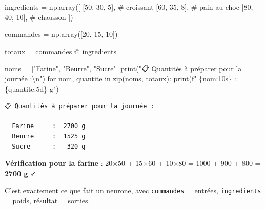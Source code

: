 \documentclass[
  french,
  11pt,
  a4paper,
]{scrbook}
\newenvironment{Shaded}{}{}
\newcommand{\BuiltInTok}[1]{\textcolor[rgb]{0.84,0.23,0.29}{#1}}
\newcommand{\CharTok}[1]{\textcolor[rgb]{0.01,0.18,0.38}{#1}}
\newcommand{\CommentTok}[1]{\textcolor[rgb]{0.42,0.45,0.49}{#1}}
\newcommand{\ControlFlowTok}[1]{\textcolor[rgb]{0.84,0.23,0.29}{#1}}
\newcommand{\DecValTok}[1]{\textcolor[rgb]{0.00,0.36,0.77}{#1}}
\newcommand{\KeywordTok}[1]{\textcolor[rgb]{0.84,0.23,0.29}{#1}}
\newcommand{\NormalTok}[1]{\textcolor[rgb]{0.14,0.16,0.18}{#1}}
\newcommand{\OperatorTok}[1]{\textcolor[rgb]{0.14,0.16,0.18}{#1}}
\newcommand{\SpecialCharTok}[1]{\textcolor[rgb]{0.00,0.36,0.77}{#1}}
\newcommand{\SpecialStringTok}[1]{\textcolor[rgb]{0.01,0.18,0.38}{#1}}
\newcommand{\StringTok}[1]{\textcolor[rgb]{0.01,0.18,0.38}{#1}}
\begin{document}
\begin{tcolorbox}[enhanced jigsaw, arc=.35mm, bottomrule=.15mm, bottomtitle=1mm, breakable, colback=white, colbacktitle=quarto-callout-tip-color!10!white, colframe=quarto-callout-tip-color-frame, coltitle=black, left=2mm, leftrule=.75mm, opacityback=0, opacitybacktitle=0.6, rightrule=.15mm, title=\textcolor{quarto-callout-tip-color}{\faLightbulb}\hspace{0.5em}{✅ Voir la correction}, titlerule=0mm, toprule=.15mm, toptitle=1mm]

\begin{Shaded}
\begin{Highlighting}[]
\NormalTok{ingredients }\OperatorTok{=}\NormalTok{ np.array([}
\NormalTok{    [}\DecValTok{50}\NormalTok{, }\DecValTok{30}\NormalTok{, }\DecValTok{5}\NormalTok{],   }\CommentTok{\# croissant}
\NormalTok{    [}\DecValTok{60}\NormalTok{, }\DecValTok{35}\NormalTok{, }\DecValTok{8}\NormalTok{],   }\CommentTok{\# pain au choc}
\NormalTok{    [}\DecValTok{80}\NormalTok{, }\DecValTok{40}\NormalTok{, }\DecValTok{10}\NormalTok{],  }\CommentTok{\# chausson}
\NormalTok{])}

\NormalTok{commandes }\OperatorTok{=}\NormalTok{ np.array([}\DecValTok{20}\NormalTok{, }\DecValTok{15}\NormalTok{, }\DecValTok{10}\NormalTok{])}

\NormalTok{totaux }\OperatorTok{=}\NormalTok{ commandes }\OperatorTok{@}\NormalTok{ ingredients}

\NormalTok{noms }\OperatorTok{=}\NormalTok{ [}\StringTok{"Farine"}\NormalTok{, }\StringTok{"Beurre"}\NormalTok{, }\StringTok{"Sucre"}\NormalTok{]}
\BuiltInTok{print}\NormalTok{(}\StringTok{"📋 Quantités à préparer pour la journée :}\CharTok{\textbackslash{}n}\StringTok{"}\NormalTok{)}
\ControlFlowTok{for}\NormalTok{ nom, quantite }\KeywordTok{in} \BuiltInTok{zip}\NormalTok{(noms, totaux):}
    \BuiltInTok{print}\NormalTok{(}\SpecialStringTok{f"  }\SpecialCharTok{\{}\NormalTok{nom}\SpecialCharTok{:10s\}}\SpecialStringTok{ : }\SpecialCharTok{\{}\NormalTok{quantite}\SpecialCharTok{:5d\}}\SpecialStringTok{ g"}\NormalTok{)}
\end{Highlighting}
\end{Shaded}

\begin{verbatim}
📋 Quantités à préparer pour la journée :

  Farine     :  2700 g
  Beurre     :  1525 g
  Sucre      :   320 g
\end{verbatim}

\textbf{Vérification pour la farine} : 20×50 + 15×60 + 10×80 = 1000 +
900 + 800 = \textbf{2700 g} ✓

C'est exactement ce que fait un neurone, avec \texttt{commandes} =
entrées, \texttt{ingredients} = poids, résultat = sorties.

\end{tcolorbox}
\end{document}
